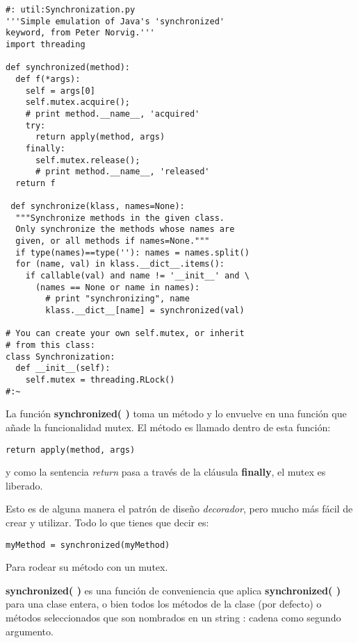 \begin{lstlisting}    
#: util:Synchronization.py 
'''Simple emulation of Java's 'synchronized' 
keyword, from Peter Norvig.''' 
import threading 

def synchronized(method): 
  def f(*args): 
    self = args[0] 
    self.mutex.acquire();   
    # print method.__name__, 'acquired' 
    try: 
      return apply(method, args) 
    finally: 
      self.mutex.release();   
      # print method.__name__, 'released' 
  return f 
  
 def synchronize(klass, names=None): 
  """Synchronize methods in the given class.   
  Only synchronize the methods whose names are  
  given, or all methods if names=None.""" 
  if type(names)==type(''): names = names.split() 
  for (name, val) in klass.__dict__.items(): 
    if callable(val) and name != '__init__' and \ 
      (names == None or name in names): 
        # print "synchronizing", name 
        klass.__dict__[name] = synchronized(val) 
        
# You can create your own self.mutex, or inherit 
# from this class: 
class Synchronization: 
  def __init__(self): 
    self.mutex = threading.RLock() 
#:~  
\end{lstlisting}

La función \textbf{synchronized( )} toma un método y lo envuelve en una función que añade la funcionalidad mutex. El método es llamado dentro de esta función:     \newline

\begin{lstlisting} 
return apply(method, args)
\end{lstlisting}

y como la sentencia \textit{return } pasa a través de la cláusula \textbf{finally}, el mutex es liberado. \newline

Esto es de alguna manera el patrón de diseño \textit{decorador}, pero mucho más fácil de crear y utilizar. Todo lo que tienes que decir es:  \newline

\begin{lstlisting} 
myMethod = synchronized(myMethod)
\end{lstlisting}

Para rodear su método con un mutex. \newline

\textbf{synchronized( )} es una función de conveniencia que aplica \textbf{synchronized( )} para una clase entera, o bien todos los métodos de la clase (por defecto) o métodos seleccionados que son nombrados en un string : cadena como segundo argumento. \newline

